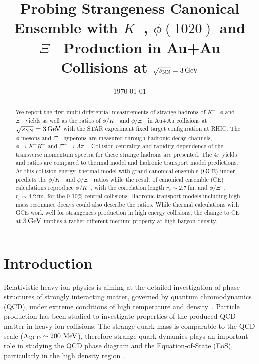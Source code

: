 \documentclass[aps,tightenlines,superscriptaddress,twocolumn]{revtex4-1}
\begin{document}
\title{Probing Strangeness Canonical Ensemble with $K^{-}$, $\phi(1020)$ and $\Xi^{-}$ Production in Au+Au Collisions at ${\sqrt{s_{\rm NN}} = \rm{3\,GeV}}$}%


%

\linenumbers

\date{\today}

\begin{abstract}
We report the first multi-differential measurements of strange hadrons of $K^{-}$, $\phi$ and $\Xi^{-}$ yields as well as the ratios of $\phi/K^-$ and $\phi/\Xi^-$ in Au+Au collisions at ${\sqrt{s_{\rm NN}} = \rm{3\,GeV}}$ with the STAR experiment fixed target configuration at RHIC. The $\phi$ mesons and $\Xi^{-}$ hyperons are measured through hadronic decay channels, $\phi\rightarrow K^+K^-$ and $\Xi^-\rightarrow \Lambda\pi^-$. 
Collision centrality and rapidity dependence of the transverse momentum spectra for these strange hadrons are presented. The $4\pi$ yields and ratios are compared to thermal model and hadronic transport model predictions.
At this collision energy, thermal model with grand canonical ensemble (GCE) under-predicts the $\phi/K^-$ and $\phi/\Xi^-$ ratios while the result of canonical ensemble (CE) calculations reproduce $\phi/K^-$, with the correlation length $r_c \sim 2.7$\,fm, and $\phi/\Xi^-$, $r_c \sim 4.2$\,fm, for the 0-10\% central collisions. Hadronic transport models including high mass resonance decays could also describe the ratios.
While thermal calculations with GCE work well for strangeness production in high energy collisions, the change to CE at $\rm{3\,GeV}$ implies a rather different medium property at high baryon density. 
\end{abstract}

\maketitle

\linenumbers

\section{Introduction}
\label{introduction}

Relativistic heavy ion physics is aiming at the detailed investigation of phase structures of strongly interacting matter, governed by quantum chromodynamics (QCD), under extreme conditions of high temperature and density~\cite{StarWhitePaper_2005,akiba2015hot,Busza_ARNPS:2018}. Particle production has been studied to investigate properties of the produced QCD matter in heavy-ion collisions. The strange quark mass is comparable to the QCD scale ($\Lambda_{\rm{QCD}}$\,$\sim\textup{200 MeV}$), therefore strange quark dynamics plays an important role in studying the QCD phase diagram and the Equation-of-State (EoS), particularly in the high density region~\cite{Rafelski:1982pu,Koch:1986ud,KO.PhysRevLett.55.2661:1985,FUCHS20061_kaons:2006,KO_sQM2017,Ks0_Lambda_HADES:2019}. 
\end{document}
